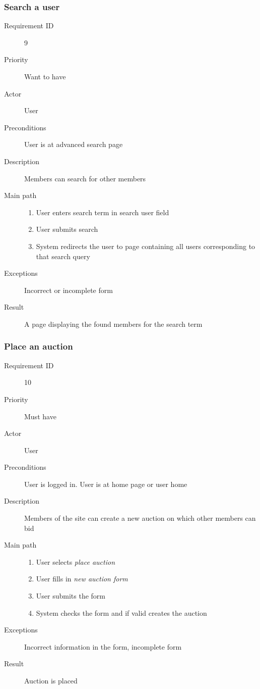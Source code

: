 		\subsubsection{Search a user}
			\begin{description}
				\item[Requirement ID] 9
				\item[Priority] Want to have
				\item[Actor] User
				\item[Preconditions] User is at advanced search page
				\item[Description] Members can search for other members 
				\item[Main path]
 					\begin{enumerate}
						\item User enters search term in search user field
						\item User submits search
						\item System redirects the user to page containing all users corresponding to that search 
						query
					\end{enumerate}
				\item[Exceptions] Incorrect or incomplete form
				\item[Result] A page displaying the found members for the search term
			\end{description}
		\subsubsection{Place an auction}
			\begin{description}
				\item[Requirement ID] 10
				\item[Priority] Must have
				\item[Actor] User
				\item[Preconditions] User is logged in. User is at home page or user home
				\item[Description] Members of the site can create a new auction on which
				other members can bid
				\item[Main path]
 					\begin{enumerate}
						\item User selects \emph{place auction}
						\item User fills in \emph{new auction form}
						\item User submits the form
						\item System checks the form and if valid creates the auction
					\end{enumerate}
				\item[Exceptions] Incorrect information in the form, incomplete form
				\item[Result] Auction is placed
			\end{description}

